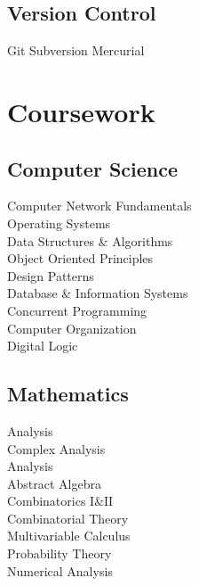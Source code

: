 \documentclass[]{cls}
\begin{document}
\begin{minipage}[t]{0.33\textwidth}
\subsection{Version Control}
Git \textbullet{}
Subversion \textbullet{}
Mercurial

\sectionsep


\section{Coursework}
\subsection{Computer Science}
Computer Network Fundamentals\\
Operating Systems\\
Data Structures \& Algorithms\\
Object Oriented Principles\\
Design Patterns\\
Database \& Information Systems\\
Concurrent Programming\\
Computer Organization\\
Digital Logic
\sectionsep
\subsection{Mathematics}
Analysis\\
Complex Analysis\\
Analysis\\
Abstract Algebra\\
Combinatorics $\mathrm{I \& II}$\\
Combinatorial Theory\\
Multivariable Calculus\\
Probability Theory\\
Numerical Analysis

%
%

\end{minipage} 
\hfill
\end{document}
